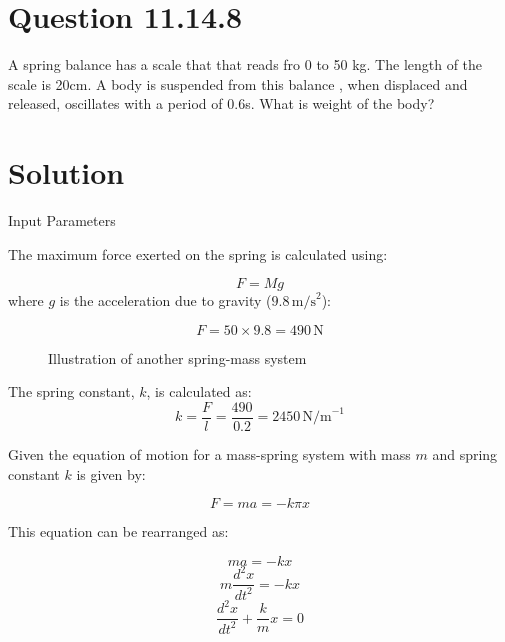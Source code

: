 \documentclass[journal,12pt,twocolumn]{IEEEtran}
\theoremstyle{remark}
\begin{document}
\section{Question 11.14.8}A spring balance has a scale that that reads fro 0 to 50 kg. The length of the scale is 20cm. A body is suspended from this balance , when displaced and released, oscillates with a period of 0.6s. What is weight of the body? 

\section{Solution}
\begin{table}[htbp]
    \centering
    \caption{Input Parameters}
    \label{tab:parameters}
    
    
\end{table}

The maximum force exerted on the spring is calculated using:

	\begin{equation}
F = Mg
	\end{equation}
where \( g \) is the acceleration due to gravity (\( 9.8 \, \text{m/s}^2 \)):\

	\begin{equation}
F = 50 \times 9.8 = 490 \, \text{N}
	\end{equation}

\begin{figure}[!h]
    \centering
    \resizebox{0.6\columnwidth}{!}
	
    \caption{Illustration of another spring-mass system}
    \label{fig:another-spring-mass-system}
\end{figure}



The spring constant, \( k \), is calculated as:
\begin{equation}
k = \frac{F}{l} = \frac{490}{0.2} = 2450 \, \text{N/m}^{-1}
\end{equation}

	Given the equation of motion for a mass-spring system with mass $m$ and spring constant $k$ is given by:

\begin{equation} 
	F = ma = -k\pi x
\end{equation}

This equation can be rearranged as:

\begin{equation}
	ma = -kx 
\end{equation}
\begin{equation}
	m\frac{d^2x}{dt^2} = -kx 
\end{equation}
\begin{equation}
	\frac{d^2x}{dt^2} + \frac{k}{m}x = 0 
\end{equation}
\end{document}
